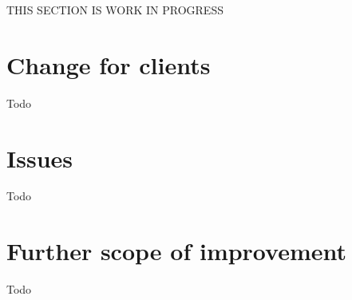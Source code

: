 
THIS SECTION IS WORK IN PROGRESS\\

\section{Change for clients}
Todo

\section{Issues}
Todo

\section{Further scope of improvement}
Todo

